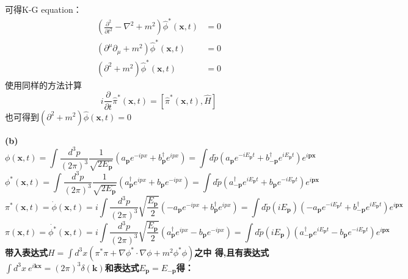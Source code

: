 \documentclass{article}
\begin{document}
可得K-G equation：
\begin{align}
(\frac{\partial^2}{\partial t^2} -\nabla^2 + m^2)\hat{\phi}^{*}(\mathbf{x},t) 	&=0 \nonumber \\
(\partial^{\mu} \partial_{\mu} +m^2) \hat{\phi}^{*}(\mathbf{x},t) 				&=0 \nonumber \\
(\partial^2 + m^2) \hat{\phi}^{*}(\mathbf{x},t) 								&=0 \nonumber
\end{align}
使用同样的方法计算
$$
i \frac{\partial}{\partial t} \hat{\pi}^{*}(\mathbf{x},t) = \left[ \hat{\pi}^{*}(\mathbf{x},t),\hat{H} \right] 
$$
也可得到$(\partial^2 + m^2) \hat{\phi}(\mathbf{x},t) =0$

\bf{(b)}
$$\phi(\mathbf{x},t) = \int \frac{d^3 p}{(2\pi)^3} \frac{1}{\sqrt{2E_\mathbf{p}}} \left(
a_{\mathbf{p}} e^{-ipx} +  b^{\dagger}_\mathbf{p} e^{ipx} \right) 
= \int d \widetilde{p}  \left(
a_{\mathbf{p}} e^{-i E_{\mathbf{p}}t} +  b^{\dagger}_{-\mathbf{p}} e^{i E_{\mathbf{p}}t} \right) 
e^{i \mathbf{p} \mathbf{x}}$$
$$\phi^{*}(\mathbf{x},t) = \int \frac{d^3 p}{(2\pi)^3}  \frac{1}{\sqrt{2E_\mathbf{p}}} \left(
a^{\dagger}_{\mathbf{p}} e^{ipx} +  b_\mathbf{p} e^{-ipx} \right)
=\int d \widetilde{p}  \left(
a^{\dagger}_{-\mathbf{p}} e^{i E_{\mathbf{p}}t} +  b_{\mathbf{p}} e^{-i E_{\mathbf{p}}t} \right) 
e^{i \mathbf{p} \mathbf{x}}$$
$$\pi^{*}(\mathbf{x},t)=\dot{\phi}(\mathbf{x},t) 
=i\int \frac{d^3 p}{(2\pi)^3} \sqrt{\frac{E_\mathbf{p}}{2}}\left(
- a_{\mathbf{p}} e^{-ipx} +  b^{\dagger}_\mathbf{p} e^{ipx} \right)
=\int d \widetilde{p}  (i E_{\mathbf{p}})\left(
- a_{\mathbf{p}} e^{-i E_{\mathbf{p}}t} +  b^{\dagger}_{-\mathbf{p}} e^{i E_{\mathbf{p}}t} \right) 
e^{i \mathbf{p} \mathbf{x}}$$
$$\pi(\mathbf{x},t)=\dot{\phi^{*}}(\mathbf{x},t) 
= i \int \frac{d^3 p}{(2\pi)^3}  \sqrt{\frac{E_\mathbf{p}}{2}} \left(
a^{\dagger}_{\mathbf{p}} e^{ipx} -  b_\mathbf{p} e^{-ipx} \right)
=\int d \widetilde{p} (i E_{\mathbf{p}}) \left(
a^{\dagger}_{-\mathbf{p}} e^{i E_{\mathbf{p}}t} -  b_{\mathbf{p}} e^{-i E_{\mathbf{p}}t} \right) 
e^{i \mathbf{p} \mathbf{x}}$$
带入表达式$H= \int d^3 x \left( \pi^{*} \pi+ \nabla \phi^{*} \cdot \nabla \phi + m^2 \phi^{*}\phi \right)$之中
得,且有表达式$\int d^3 x \: e^{i \mathbf{k} \mathbf{x}} = (2 \pi)^3 \delta(\mathbf{k})$和表达式$E_{\mathbf{p}}=E_{-\mathbf{p}}$得：
\end{document}
